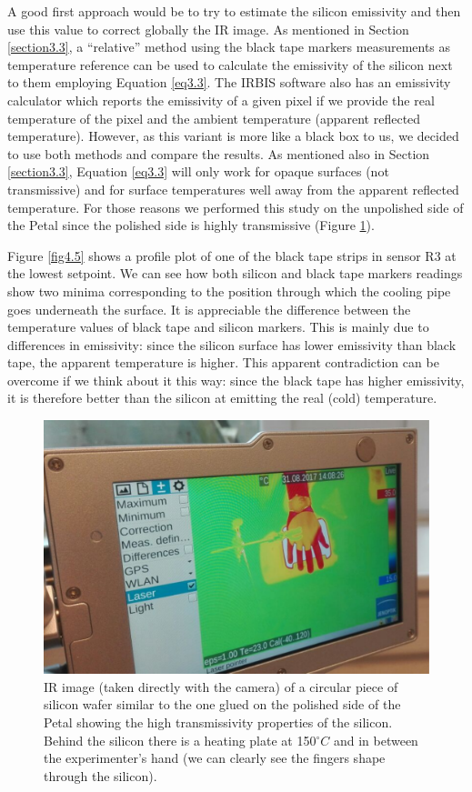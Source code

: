 		A good first approach would be to try to estimate the silicon emissivity and then use this value to correct globally the IR image. As mentioned in Section \ref{section3.3}, a “relative” method using the black tape markers measurements as temperature reference can be used to calculate the emissivity of the silicon next to them employing Equation \ref{eq3.3}. The IRBIS software also has an emissivity calculator which reports the emissivity of a given pixel if we provide the real temperature of the pixel and the ambient temperature (apparent reflected temperature). However, as this variant is more like a black box to us, we decided to use both methods and compare the results. As mentioned also in Section \ref{section3.3}, Equation \ref{eq3.3} will only work for opaque surfaces (not transmissive) and for surface temperatures well away from the apparent reflected temperature. For those reasons we performed this study on the unpolished side of the Petal since the polished side is highly transmissive (Figure \ref{fig4.4}).
		
		Figure \ref{fig4.5} shows a profile plot of one of the black tape strips in sensor R3 at the lowest setpoint. We can see how both silicon and black tape markers readings show two minima corresponding to the position through which the cooling pipe goes underneath the surface. It is appreciable the difference between the temperature values of black tape and silicon markers. This is mainly due to differences in emissivity: since the silicon surface has lower emissivity than black tape, the apparent temperature is higher. This apparent contradiction can be overcome if we think about it this way: since the black tape has higher emissivity, it is therefore better than the silicon at emitting the real (cold) temperature.
		
		\begin{figure}[ht!]
			\centering
			\captionsetup{justification=centering,margin=2cm}
			\includegraphics[scale=0.35]{Figures/Chapter04/HandTransmission.pdf}
			\caption{IR image (taken directly with the camera) of a circular piece of silicon wafer similar to the one glued on the polished side of the Petal showing the high transmissivity properties of the silicon. Behind the silicon there is a heating plate at 150\space$^\circ C$ and in between the experimenter’s hand (we can clearly see the fingers shape through the silicon).}\label{fig4.4}
		\end{figure}
		
